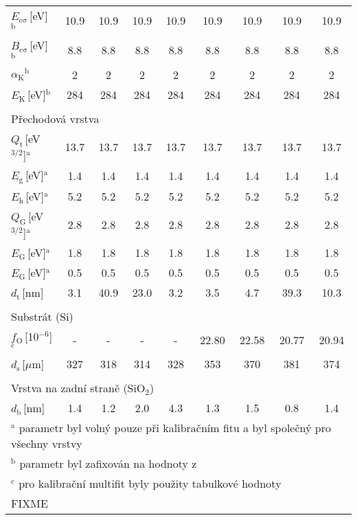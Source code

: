 \begin{tabular}{lcccccccc}
$E_\mathrm{c\sigma}$\,[eV]$^\mathrm{b}$ & 10.9 & 10.9 & 10.9 & 10.9 & 10.9 & 10.9 & 10.9 & 10.9\\
$B_\mathrm{c\sigma}$\,[eV]$^\mathrm{b}$ & 8.8 & 8.8 & 8.8 & 8.8 & 8.8 & 8.8 & 8.8 & 8.8\\
$\alpha_\mathrm{K}$$^\mathrm{b}$ & 2 & 2 & 2 & 2 & 2 & 2 & 2 & 2\\
$E_\mathrm{K}$\,[eV]$^\mathrm{b}$ & 284 & 284 & 284 & 284 & 284 & 284 & 284 & 284\\
\multicolumn{9}{l}{}\\
\multicolumn{9}{l}{Přechodová vrstva}\\
\hline
$Q_\mathrm{t}$\,[eV$^{3/2}$]$^\mathrm{a}$ & 13.7 & 13.7 & 13.7 & 13.7 & 13.7 & 13.7 & 13.7 & 13.7\\
$E_\mathrm{g}$\,[eV]$^\mathrm{a}$ & 1.4 & 1.4 & 1.4 & 1.4 & 1.4 & 1.4 & 1.4 & 1.4\\
$E_\mathrm{h}$\,[eV]$^\mathrm{a}$ & 5.2 & 5.2 & 5.2 & 5.2 & 5.2 & 5.2 & 5.2 & 5.2\\
$Q_\mathrm{G}$\,[eV$^{3/2}$]$^\mathrm{a}$ & 2.8 & 2.8 & 2.8 & 2.8 & 2.8 & 2.8 & 2.8 & 2.8\\
$E_\mathrm{G}$\,[eV]$^\mathrm{a}$ & 1.8 & 1.8 & 1.8 & 1.8 & 1.8 & 1.8 & 1.8 & 1.8\\
$E_\mathrm{G}$\,[eV]$^\mathrm{a}$ & 0.5 & 0.5 & 0.5 & 0.5 & 0.5 & 0.5 & 0.5 & 0.5\\
$d_\mathrm{t}$\,[nm] & 3.1 & 40.9 & 23.0 & 3.2 & 3.5 & 4.7 & 39.3 & 10.3\\
\multicolumn{9}{l}{}\\
\multicolumn{9}{l}{Substrát (Si)}\\
\hline
$f_\mathrm{O}$\,[10$^{-6}$]$^\mathrm{c}$ & - & - & - & - & 22.80 & 22.58 & 20.77 & 20.94\\
$d_\mathrm{s}$\,[$\mu$m] & 327 & 318 & 314 & 328 & 353 & 370 & 381 & 374\\
\multicolumn{9}{l}{}\\
\multicolumn{9}{l}{Vrstva na zadní straně (SiO$_2$)}\\
\hline
$d_\mathrm{b}$\,[nm] & 1.4 & 1.2 & 2.0 & 4.3 & 1.3 & 1.5 & 0.8 & 1.4\\
\hline
\multicolumn{9}{l}{$^\mathrm{a}$ parametr byl volný pouze při kalibračním fitu a byl společný pro všechny vrstvy}\\
\multicolumn{9}{l}{$^\mathrm{b}$ parametr byl zafixován na hodnoty z \cite{Franta2011}}\\
\multicolumn{9}{l}{$^\mathrm{c}$ pro kalibrační multifit byly použity tabulkové hodnoty}\\
\multicolumn{9}{l}{FIXME}\\
\end{tabular}
